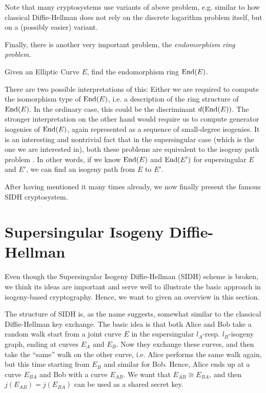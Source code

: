 Note that many cryptosystems use variants of above problem, e.g. similar to how classical Diffie-Hellman does not rely on the discrete logarithm problem itself, but on a (possibly easier) variant.

Finally, there is another very important problem, the \emph{endomorphism ring problem}.
\begin{problem}
    Given an Elliptic Curve $E$, find the endomorphism ring $\mathrm{End}(E)$.
\end{problem}
There are two possible interpretations of this:
Either we are required to compute the isomorphism type of $\mathrm{End}(E)$, i.e. a description of the ring structure of $\mathrm{End}(E)$.
In the ordinary case, this could be the discriminant $d(\mathrm{End}(E))$.
The stronger interpretation on the other hand would require us to compute generator isogenies of $\mathrm{End}(E)$, again represented as a sequence of small-degree isogenies.
It is an interesting and nontrivial fact that in the supersingular case (which is the one we are interested in), both these problems are equivalent to the isogeny path problem \cite{endomorphism_ring_isogeny_path_equivalent}.
In other words, if we know $\mathrm{End}(E)$ and $\mathrm{End}(E')$ for supersingular $E$ and $E'$, we can find an isogeny path from $E$ to $E'$.

After having mentioned it many times already, we now finally present the famous SIDH cryptosystem.

\section{Supersingular Isogeny Diffie-Hellman}
Even though the Supersingular Isogeny Diffie-Hellman (SIDH) scheme is broken, we think its ideas are important and serve well to illustrate the basic approach in isogeny-based cryptography.
Hence, we want to given an overview in this section.

The structure of SIDH is, as the name suggests, somewhat similar to the classical Diffie-Hellman key exchange.
The basic idea is that both Alice and Bob take a random walk start from a joint curve $E$ in the supersingular $l_A$-resp. $l_B$-isogeny graph, ending at curves $E_A$ and $E_B$.
Now they exchange these curves, and then take the ``same'' walk on the other curve, i.e. Alice performs the same walk again, but this time starting from $E_B$ and similar for Bob.
Hence, Alice ends up at a curve $E_{BA}$ and Bob with a curve $E_{AB}$.
We want that $E_{AB} \cong E_{BA}$, and then $j(E_{AB}) = j(E_{BA})$ can be used as a shared secret key.


